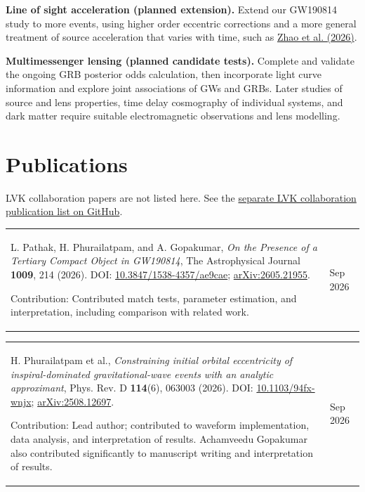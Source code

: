 \documentclass[margin,line]{res}
\begin{document}
\begin{resume}
\textbf{Line of sight acceleration (planned extension).} Extend our GW190814 study to more events, using higher order eccentric corrections and a more general treatment of source acceleration that varies with time, such as \href{https://arxiv.org/abs/2604.00253}{Zhao et al. (2026)}.

\textbf{Multimessenger lensing (planned candidate tests).} Complete and validate the ongoing GRB posterior odds calculation, then incorporate light curve information and explore joint associations of GWs and GRBs. Later studies of source and lens properties, time delay cosmography of individual systems, and dark matter require suitable electromagnetic observations and lens modelling. \\

\section{\sc Publications}
LVK collaboration papers are not listed here. See the \href{https://github.com/hemantaph/resume/blob/main/LVK_resume_common/LVK_Collaboration_Publications.pdf}{separate LVK collaboration publication list on GitHub}.

\begingroup


\begin{tabular}{@{}p{\dimexpr\linewidth-0.62in-3\tabcolsep\relax}p{0.62in}}
    L. Pathak, H. Phurailatpam, and A. Gopakumar, \textit{On the Presence of a Tertiary Compact Object in GW190814}, The Astrophysical Journal \textbf{1009}, 214 (2026). DOI: \href{https://doi.org/10.3847/1538-4357/ae9cae}{10.3847/1538-4357/ae9cae}; \href{https://arxiv.org/abs/2605.21955}{arXiv:2605.21955}.
    \par\smallskip Contribution: Contributed match tests, parameter estimation, and interpretation, including comparison with related work. & \raggedright Sep 2026
\end{tabular}

\begin{tabular}{@{}p{\dimexpr\linewidth-0.62in-3\tabcolsep\relax}p{0.62in}}
    H. Phurailatpam et al., \textit{Constraining initial orbital eccentricity of inspiral-dominated gravitational-wave events with an analytic approximant}, Phys. Rev. D \textbf{114}(6), 063003 (2026). DOI: \href{https://doi.org/10.1103/94fx-wnjx}{10.1103/94fx-wnjx}; \href{https://arxiv.org/abs/2508.12697}{arXiv:2508.12697}.
    \par\smallskip Contribution: Lead author; contributed to waveform implementation, data analysis, and interpretation of results. Achamveedu Gopakumar also contributed significantly to manuscript writing and interpretation of results. & \raggedright Sep 2026
\end{tabular}


\end{resume}
\end{document}
